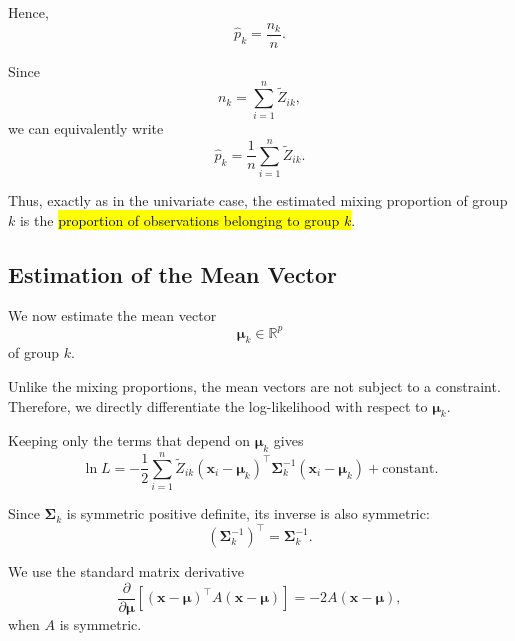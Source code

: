 Hence,
\begin{equation*}
\boxed{
\hat{p}_k=\frac{n_k}{n}
}.
\end{equation*}

Since
\begin{equation*}
n_k=\sum_{i=1}^n\tilde{Z}_{ik},
\end{equation*}
we can equivalently write
\begin{equation*}
\boxed{
\hat{p}_k
=
\frac{1}{n}
\sum_{i=1}^n\tilde{Z}_{ik}
}.
\end{equation*}

Thus, exactly as in the univariate case, the estimated mixing
proportion of group $k$ is the \hl{proportion of observations
belonging to group $k$}.


\subsection{Estimation of the Mean Vector}

We now estimate the mean vector
\begin{equation*}
\boldsymbol{\mu}_k\in\mathbb{R}^p
\end{equation*}
of group $k$.

Unlike the mixing proportions, the mean vectors are not subject to
a constraint. Therefore, we directly differentiate the
log-likelihood with respect to $\boldsymbol{\mu}_k$.

Keeping only the terms that depend on $\boldsymbol{\mu}_k$ gives
\begin{equation*}
\ln L
=
-\frac{1}{2}
\sum_{i=1}^n
\tilde{Z}_{ik}
(\boldsymbol{x}_i-\boldsymbol{\mu}_k)^\top
\boldsymbol{\Sigma}_k^{-1}
(\boldsymbol{x}_i-\boldsymbol{\mu}_k)
+
\text{constant}.
\end{equation*}

Since $\boldsymbol{\Sigma}_k$ is symmetric positive definite,
its inverse is also symmetric:
\begin{equation*}
(\boldsymbol{\Sigma}_k^{-1})^\top
=
\boldsymbol{\Sigma}_k^{-1}.
\end{equation*}

We use the standard matrix derivative
\begin{equation*}
\frac{\partial}{\partial\boldsymbol{\mu}}
\left[
(\boldsymbol{x}-\boldsymbol{\mu})^\top
A
(\boldsymbol{x}-\boldsymbol{\mu})
\right]
=
-2A(\boldsymbol{x}-\boldsymbol{\mu}),
\end{equation*}
when $A$ is symmetric.

